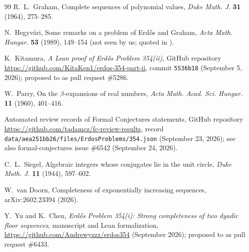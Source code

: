 \documentclass[11pt]{amsart}
\theoremstyle{definition}
\theoremstyle{remark}
\begin{document}
\begin{thebibliography}{99}
 R.~L.~Graham, Complete sequences of polynomial values, \emph{Duke Math. J.}
\textbf{31} (1964), 275--285.

 N.~Hegyv\'ari, Some remarks on a problem of Erd\H{o}s and Graham, \emph{Acta Math.
Hungar.} \textbf{53} (1989), 149--154 (not seen by us; quoted in \cite{Rev26}).

 K.~Kitamura, \emph{A Lean proof of Erd\H{o}s Problem 354(ii)}, GitHub repository
\url{https://github.com/KitaKen1/erdos-354-part-ii}, commit \texttt{5536b18} (September 5, 2026);
proposed to \cite{FC} as pull request \#5286.

 W.~Parry, On the $\beta$-expansions of real numbers, \emph{Acta Math. Acad. Sci.
Hungar.} \textbf{11} (1960), 401--416.

 Automated review records of Formal Conjectures statements, GitHub repository
\url{https://github.com/tadamcz/fc-review-results}, record
\nolinkurl{data/aea251bb26/files/ErdosProblems/354.json} (September 23, 2026); see also
formal-conjectures issue \#6542 (September 24, 2026).

 C.~L.~Siegel, Algebraic integers whose conjugates lie in the unit circle,
\emph{Duke Math. J.} \textbf{11} (1944), 597--602.

 W.~van Doorn, Completeness of exponentially increasing sequences,
arXiv:2602.23394 (2026).

 Y.~Yu and K.~Chen, \emph{Erd\H{o}s Problem 354(i): Strong completeness of two
dyadic floor sequences}, manuscript and Lean formalization,
\url{https://github.com/Andrewyzzz/erdos354} (September 2026); proposed to \cite{FC} as pull
request \#6433.

\end{thebibliography}
\end{document}
